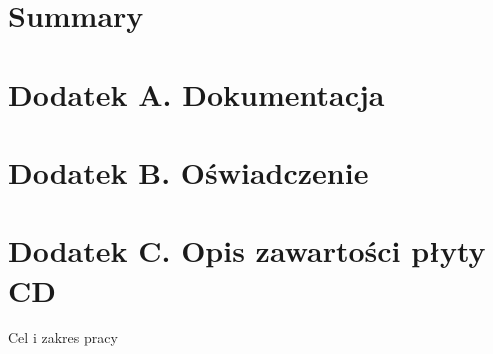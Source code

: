 \documentclass[a4paper,12pt,polish,oneside]{thesis}
\begin{document}
\chapter*{Summary}

\chapter*{Dodatek A. Dokumentacja}
\chapter*{Dodatek B. Oświadczenie}
\chapter*{Dodatek C. Opis zawartości płyty CD}
\label{chap:cd}

Cel i zakres pracy\cite{bib:test}

\listoffigures
\listoftables
\lstlistoflistings
\end{document}
